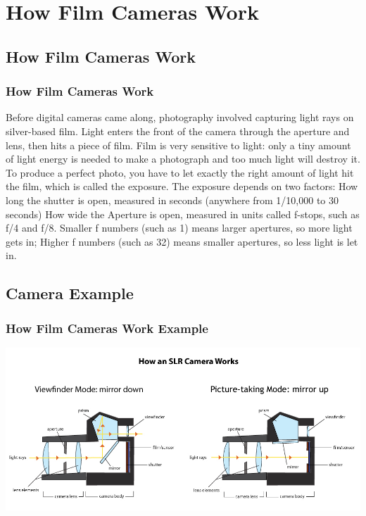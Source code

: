 \documentclass{beamer}
\begin{document}
\section{How Film Cameras Work}

\subsection{How Film Cameras Work}		

\begin{frame}
	\frametitle{How Film Cameras Work}
	\begin{outline}
		\1 Before digital cameras came along, photography involved capturing light rays on silver-based film.
		\1 Light enters the front of the camera through the aperture and lens, then hits a piece of film. 
		\1 Film is very sensitive to light: 
		\2 only a tiny amount of light energy is needed to make a photograph and too much light will destroy it. 
		\1 To produce a perfect photo, you have to let exactly the right amount of light hit the film, which is called the exposure. 
		\1 The exposure depends on two factors: 
		\2 How long the shutter is open, measured in seconds (anywhere from 1/10,000 to 30 seconds)
		\1 How wide the Aperture is open, measured in units called f-stops, such as f/4 and f/8. 
		\2 Smaller f numbers (such as 1) means larger apertures, so more light gets in; 
		\2 Higher f numbers (such as 32) means smaller apertures, so less light is let in.
	\end{outline}
\end{frame}

\subsection{Camera Example}		
\begin{frame}
	\frametitle{How Film Cameras Work Example}
	\begin{center}
		\includegraphics[width=1.10\textwidth]{images/How Camera Works.jpg}
	\end{center}
\end{frame}
\end{document}
